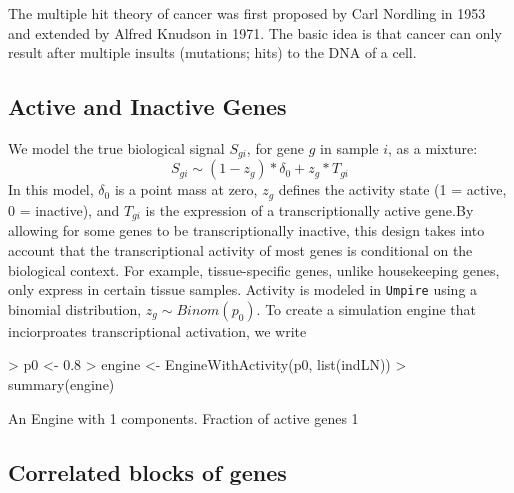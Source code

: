 \documentclass[11pt]{article}
\def\rcode#1{\texttt{#1}}
\begin{document}
The multiple hit theory of cancer was first proposed by Carl Nordling
in 1953~\cite{nordling} and extended by Alfred Knudson in 1971.  The
basic idea is that cancer can only result after multiple insults
(mutations; hits) to the DNA of a cell.  

\subsection{Active and Inactive Genes}

We model the true biological signal $S_{gi}$, for gene $g$ in sample
$i$, as a  mixture:
\[S_{gi} \sim (1-z_g) *\delta_0 + z_g * T_{gi}\]
In this model, $\delta_0$ is a point mass at zero, $z_g$ defines the
activity state (1 = active, 0 = inactive), and $T_{gi}$ is the
expression of a transcriptionally active gene.By allowing for some
genes to be transcriptionally inactive, this design takes into account
that the transcriptional activity of most genes is conditional on the
biological context.  For example, tissue-specific genes, unlike
housekeeping genes, only express in certain tissue samples.  Activity
is modeled in \rcode{Umpire} using a binomial distribution, $z_g \sim
Binom(p_0)$.  To create a simulation engine that inciorproates
transcriptional activation, we write
\begin{Schunk}
\begin{Sinput}
> p0 <- 0.8
> engine <- EngineWithActivity(p0, list(indLN))
> summary(engine)
\end{Sinput}
\begin{Soutput}
An Engine with 1 components.
Fraction of active genes 1
\end{Soutput}
\end{Schunk}





\subsection{ Correlated blocks of genes}
  
\end{document}
